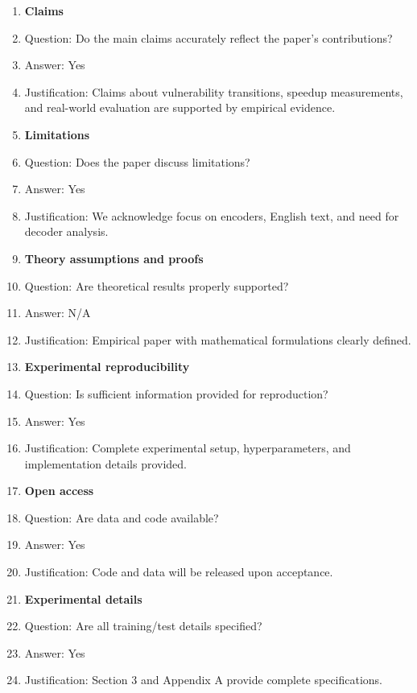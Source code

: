 \documentclass{article}
\begin{document}
\begin{enumerate}

\item {\bf Claims}
    \item[] Question: Do the main claims accurately reflect the paper's contributions?
    \item[] Answer: Yes
    \item[] Justification: Claims about vulnerability transitions, speedup measurements, and real-world evaluation are supported by empirical evidence.

\item {\bf Limitations}
    \item[] Question: Does the paper discuss limitations?
    \item[] Answer: Yes
    \item[] Justification: We acknowledge focus on encoders, English text, and need for decoder analysis.

\item {\bf Theory assumptions and proofs}
    \item[] Question: Are theoretical results properly supported?
    \item[] Answer: N/A
    \item[] Justification: Empirical paper with mathematical formulations clearly defined.

\item {\bf Experimental reproducibility}
    \item[] Question: Is sufficient information provided for reproduction?
    \item[] Answer: Yes
    \item[] Justification: Complete experimental setup, hyperparameters, and implementation details provided.

\item {\bf Open access}
    \item[] Question: Are data and code available?
    \item[] Answer: Yes
    \item[] Justification: Code and data will be released upon acceptance.

\item {\bf Experimental details}
    \item[] Question: Are all training/test details specified?
    \item[] Answer: Yes
    \item[] Justification: Section 3 and Appendix A provide complete specifications.


\end{enumerate}
\end{document}
